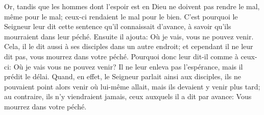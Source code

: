Or, tandis que les hommes dont l’espoir est en Dieu
	ne doivent pas rendre le mal, même pour le mal;
	ceux-ci rendaient le mal pour le bien.
C’est pourquoi le Seigneur leur dit cette sentence qu’il connaissait d’avance,
	à savoir qu’ils mourraient dans leur péché.
Ensuite il ajouta: Où je vais, vous ne pouvez venir.
Cela, il le dit aussi à ses disciples dans un autre endroit;
	et cependant il ne leur dit pas, vous mourrez dans votre péché.
Pourquoi donc leur dit-il comme à ceux-ci: Où je vais vous ne pouvez venir?
	Il ne leur enleva pas l’espérance, mais il prédit le délai.
Quand, en effet, le Seigneur parlait ainsi aux disciples,
	ils ne pouvaient point alors venir où lui-même allait,
	mais ils devaient y venir plus tard;
	au contraire, ils n’y viendraient jamais,
	ceux auxquels il a dit par avance:
	Vous mourrez dans votre péché.

